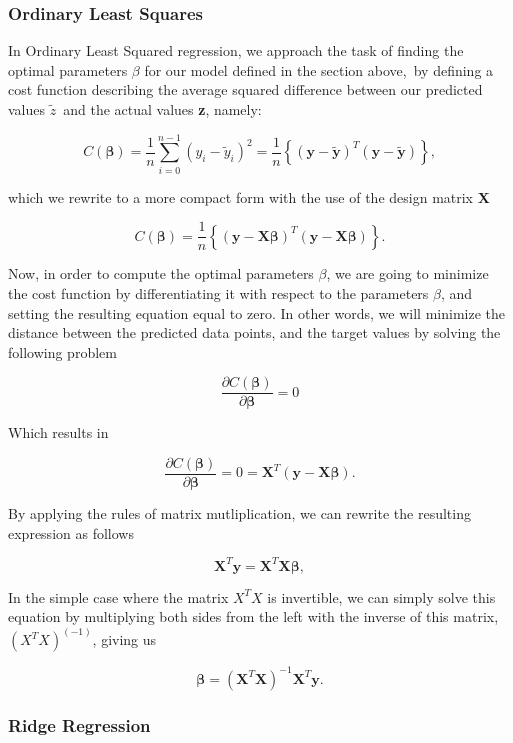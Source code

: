 \documentclass[a4paper, 10pt]{article}
\begin{document}
\subsubsection{Ordinary Least Squares}
In Ordinary Least Squared regression, we approach the task of finding the optimal parameters $\beta$ for our model defined in the section above, by defining a cost function describing the average squared difference between our predicted values \textbf{$\tilde{z}$} and the actual values \textbf{z}, namely: 

$$
C(\boldsymbol{\beta})=\frac{1}{n}\sum_{i=0}^{n-1}\left(y_i-\tilde{y}_i\right)^2=\frac{1}{n}\left\{\left(\boldsymbol{y}-\boldsymbol{\tilde{y}}\right)^T\left(\boldsymbol{y}-\boldsymbol{\tilde{y}}\right)\right\},
$$

which we rewrite to a more compact form with the use of the design matrix \textbf{X}

$$
C(\boldsymbol{\beta})=\frac{1}{n}\left\{\left(\boldsymbol{y}-\boldsymbol{X}\boldsymbol{\beta}\right)^T\left(\boldsymbol{y}-\boldsymbol{X}\boldsymbol{\beta}\right)\right\}.
$$

Now, in order to compute the optimal parameters $\beta$, we are going to minimize the cost function by differentiating it with respect to the parameters $\beta$, and setting the resulting equation equal to zero. In other words, we will minimize the distance between the predicted data points, and the target values by solving the following problem

$$
\frac{\partial C(\boldsymbol{\beta})}{\partial \boldsymbol{\beta}} = 0
$$

Which results in

$$
\frac{\partial C(\boldsymbol{\beta})}{\partial \boldsymbol{\beta}} = 0 = \boldsymbol{X}^T\left( \boldsymbol{y}-\boldsymbol{X}\boldsymbol{\beta}\right).
$$

By applying the rules of matrix mutliplication, we can rewrite the resulting expression as follows

$$
\boldsymbol{X}^T\boldsymbol{y} = \boldsymbol{X}^T\boldsymbol{X}\boldsymbol{\beta},
$$

In the simple case where the matrix $X^TX$ is invertible, we can simply solve this equation by multiplying both sides from the left with the inverse of this matrix, $(X^TX)^(-1)$, giving us

$$
\boldsymbol{\beta} =\left(\boldsymbol{X}^T\boldsymbol{X}\right)^{-1}\boldsymbol{X}^T\boldsymbol{y}.
$$

\subsubsection{Ridge Regression}
\end{document}
